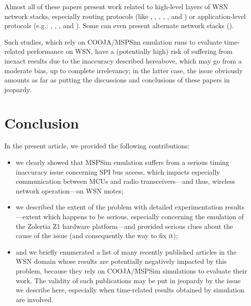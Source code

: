 \documentclass[a4paper,10pt]{article}
\begin{document}
Almost all of these papers present work related to high-level layers
of WSN network stacks, especially routing protocols (like
\cite{Constrain-Routing-Trees-2014}, \cite{Contiki-RPL-Eval-2014},
\cite{Co-RPL-2014}, \cite{IETF-Routing-WSN-2014},
\cite{RPL-GreenHouse-Convgc-Time-2014}, and \cite{Trickle-L2-2014})
or application-level protocols (e.g.: \cite{DINAS-2014},
\cite{Efficient-Distrib-Svc-Discovery-2014}, \cite{Key-Mgmt-2015},
and \cite{Visual-Sensor-Networks-2014}).
Some can even present alternate network stacks (\cite{TinySDN-2014}).

\medskip

Such studies, which rely on COOJA/MSPSim emulation runs to evaluate
time-related performance on WSN, have a (potentially high) risk of
suffering from inexact results due to the inaccuracy described hereabove,
which may go from a moderate bias, up to complete irrelevancy; in the latter
case, the issue obviously amounts as far as putting the discussions and
conclusions of these papers in jeopardy.


\section{Conclusion}
\label{conclusion}

In the present article, we provided the following contributions:
\begin{itemize}
\item we clearly showed that MSPSim emulation suffers from a serious timing
inaccuracy issue concerning SPI bus access, which impacts especially
communication between MCUs and radio transceivers---and thus, wireless
network operation---on WSN motes;
\item we described the extent of the problem with detailed experimentation
results---extent which happens to be serious, especially concerning the
emulation of the Zolertia Z1 hardware platform---and provided serious clues
about the cause of the issue (and consequently the way to fix it);
\item and we briefly enumerated a list of many recently published articles
in the WSN domain whose results are potentially negatively impacted by this
problem, because they rely on COOJA/MSPSim simulations to evaluate their work.
The validity of such publications may be put in jeopardy by the
issue we describe here, especially when time-related results
obtained by simulation are involved.
\end{itemize}
\end{document}

